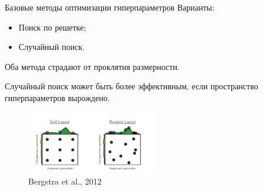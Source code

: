 \documentclass[10pt,pdf,utf8,russian,aspectratio=169]{beamer}
\begin{document}
\begin{frame}{Базовые методы оптимизации гиперпараметров}
Варианты:
\begin{itemize}
\item Поиск по решетке;
\item Случайный поиск.
\end{itemize}

Оба метода страдают от проклятия размерности.

Случайный поиск может быть более эффективным, если пространство гиперпараметров вырождено.
\begin{figure}
\begin{centering}
\includegraphics[width=0.5\textwidth]{random_search.png}
\end{centering}
\caption*{Bergstra et al., 2012}
\end{figure}
\end{frame}
\end{document}
